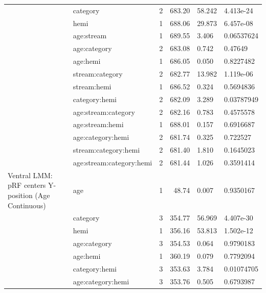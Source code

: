 \begin{table}
\begin{tabular}{llrrll}
 & category & 2 & 683.20 & 58.242 & 4.413e-24\\
\addlinespace
 & hemi & 1 & 688.06 & 29.873 & 6.457e-08\\
 & age:stream & 1 & 689.55 & 3.406 & 0.06537624\\
 & age:category & 2 & 683.08 & 0.742 & 0.47649\\
 & age:hemi & 1 & 686.05 & 0.050 & 0.8227482\\
 & stream:category & 2 & 682.77 & 13.982 & 1.119e-06\\
\addlinespace
 & stream:hemi & 1 & 686.52 & 0.324 & 0.5694836\\
 & category:hemi & 2 & 682.09 & 3.289 & 0.03787949\\
 & age:stream:category & 2 & 682.16 & 0.783 & 0.4575578\\
 & age:stream:hemi & 1 & 688.01 & 0.157 & 0.6916687\\
 & age:category:hemi & 2 & 681.74 & 0.325 & 0.722527\\
\addlinespace
 & stream:category:hemi & 2 & 681.40 & 1.810 & 0.1645023\\
 & age:stream:category:hemi & 2 & 681.44 & 1.026 & 0.3591414\\
Ventral LMM: pRF centers Y-position (Age Continuous) & age & 1 & 48.74 & 0.007 & 0.9350167\\
 & category & 3 & 354.77 & 56.969 & 4.407e-30\\
 & hemi & 1 & 356.16 & 53.813 & 1.502e-12\\
\addlinespace
 & age:category & 3 & 354.53 & 0.064 & 0.9790183\\
 & age:hemi & 1 & 360.19 & 0.079 & 0.7792094\\
 & category:hemi & 3 & 353.63 & 3.784 & 0.01074705\\
 & age:category:hemi & 3 & 353.76 & 0.505 & 0.6793987\\
\bottomrule
\end{tabular}
\end{table}
